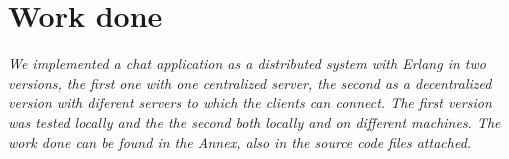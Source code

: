 \section{Work done}

\textit{We  implemented a chat application as a distributed system with Erlang in two versions, the first one with one centralized server, the second as a decentralized version with diferent servers to which the clients can connect. The first version was tested locally and the the second both locally and on different machines. 
\newline The work done can be found in the Annex, also in the source code files attached.}